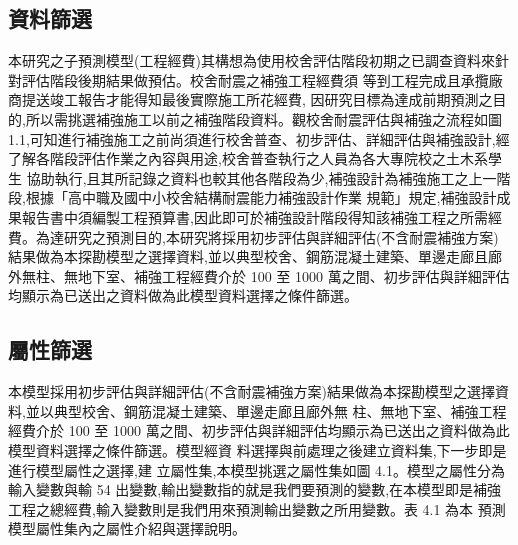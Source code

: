\subsection{資料篩選}

本研究之子預測模型(工程經費)其構想為使用校舍評估階段初期之已調查資料來針對評估階段後期結果做預估。校舍耐震之補強工程經費須 等到工程完成且承攬廠商提送竣工報告才能得知最後實際施工所花經費, 因研究目標為達成前期預測之目的,所以需挑選補強施工以前之補強階段資料。觀校舍耐震評估與補強之流程如圖 1.1,可知進行補強施工之前尚須進行校舍普查、初步評估、詳細評估與補強設計,經了解各階段評估作業之內容與用途,校舍普查執行之人員為各大專院校之土木系學生 協助執行,且其所記錄之資料也較其他各階段為少,補強設計為補強施工之上一階段,根據「高中職及國中小校舍結構耐震能力補強設計作業 規範」規定,補強設計成果報告書中須編製工程預算書,因此即可於補強設計階段得知該補強工程之所需經費。為達研究之預測目的,本研究將採用初步評估與詳細評估(不含耐震補強方案)結果做為本探勘模型之選擇資料,並以典型校舍、鋼筋混凝土建築、單邊走廊且廊外無柱、無地下室、補強工程經費介於 100 至 1000 萬之間、初步評估與詳細評估均顯示為已送出之資料做為此模型資料選擇之條件篩選。

\subsection{屬性篩選}

本模型採用初步評估與詳細評估(不含耐震補強方案)結果做為本探勘模型之選擇資料,並以典型校舍、鋼筋混凝土建築、單邊走廊且廊外無 柱、無地下室、補強工程經費介於 100 至 1000 萬之間、初步評估與詳細評估均顯示為已送出之資料做為此模型資料選擇之條件篩選。模型經資 料選擇與前處理之後建立資料集,下一步即是進行模型屬性之選擇,建
立屬性集,本模型挑選之屬性集如圖 4.1。模型之屬性分為輸入變數與輸 54
出變數,輸出變數指的就是我們要預測的變數,在本模型即是補強工程之總經費,輸入變數則是我們用來預測輸出變數之所用變數。表 4.1 為本 預測模型屬性集內之屬性介紹與選擇說明。

